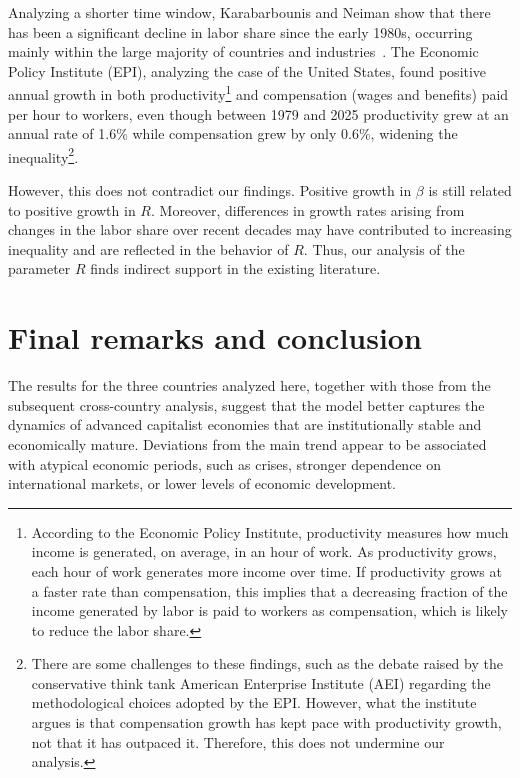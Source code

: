 \documentclass[12pt]{article}
\begin{document}
Analyzing a shorter time window, Karabarbounis and Neiman show that there has been a significant decline in labor share since the early 1980s, occurring mainly within the large majority of countries and industries~\cite{repec:nbr:nberwo:19136}. 
%
The Economic Policy Institute (EPI), analyzing the case of the United States, found positive annual growth in both productivity\footnote{According to the  Economic Policy Institute, productivity measures how much income is generated,
on average, in an hour of work. As productivity grows,  each hour of work generates more income over time. If productivity grows at a faster rate than compensation, 
this implies that a decreasing fraction of the income generated by labor is paid to workers as compensation, which is likely to reduce the labor share.}
%
and compensation (wages and benefits) paid per hour to workers, even though between 1979 and 2025 productivity grew at an annual rate of 1.6\% while compensation grew by only 0.6\%\cite{epi_productivity_pay_gap_2026}, widening the inequality\footnote{There are some challenges to these findings, such as the debate raised by the conservative think tank American Enterprise Institute (AEI) regarding the methodological choices adopted by the EPI. However, what the institute argues is that compensation growth has kept pace with productivity growth, not that it has outpaced it. Therefore, this does not undermine our analysis\cite{AEI}. }.

However, this does not contradict our findings. Positive growth in $\beta$ is still related to positive growth in $R$. 
Moreover, differences in growth rates arising from changes in the labor share over recent decades may have contributed to increasing inequality and are reflected in the behavior of $R$. Thus, our analysis of the parameter $R$ finds indirect support in the existing literature.
 
\section{Final remarks and conclusion}
\label{sec:final}

The results for the three countries analyzed here, together with those from the subsequent cross-country analysis, suggest that the model better captures the dynamics of advanced capitalist economies that are institutionally stable and economically mature. Deviations from the main trend appear to be associated with atypical economic periods, such as crises, stronger dependence on international markets, or lower levels of economic development.
\end{document}
